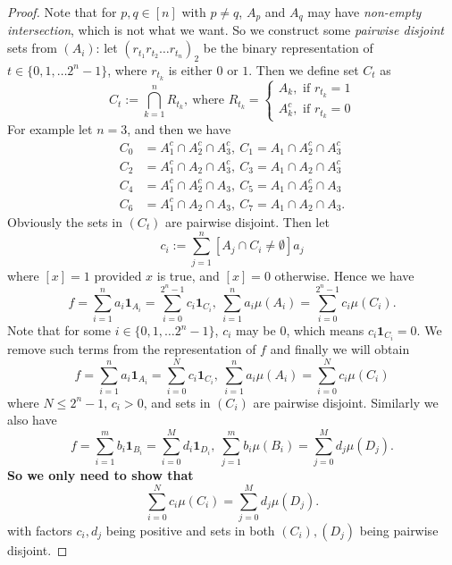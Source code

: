 \documentclass[a4paper, linespread=1.5]{article}
\newcommand{\IndicatorFunc}[1]{\mathbf{1}_{#1}}
\begin{document}
        \begin{proof}
            Note that for $p, q \in [n]$ with $p \neq q$, $A_p$ and $A_q$ may have \textit{non-empty intersection}, which is not what we want. So we construct some {\it pairwise disjoint} sets from $(A_i)$: let $(r_{t_1}r_{t_2}\ldots r_{t_n})_2$ be the binary representation of $t \in \{0, 1, \ldots 2^n - 1\}$, where $r_{t_k}$ is either $0$ or $1$. Then we define set $C_t$ as
            $$
            C_t := \bigcap_{k = 1}^n R_{t_k},\ \textrm{where } R_{t_k} = \left\{
            \begin{aligned}
            A_k, \textrm{ if } r_{t_k} = 1 \\
            A_k^c, \textrm{ if } r_{t_k} = 0
            \end{aligned}
            \right.
            $$
            For example let $n = 3$, and then we have
            \begin{align*}
                C_0 &= A_1^c \cap A_2^c \cap A_3^c,\ C_1 = A_1 \cap A_2^c \cap A_3^c \\
                C_2 &= A_1^c \cap A_2 \cap A_3^c,\ C_3 = A_1 \cap A_2 \cap A_3^c \\
                C_4 &= A_1^c \cap A_2^c \cap A_3,\ C_5 = A_1 \cap A_2^c \cap A_3 \\
                C_6 &= A_1^c \cap A_2 \cap A_3,\ C_7 = A_1 \cap A_2 \cap A_3.
            \end{align*}
            Obviously the sets in $(C_t)$ are pairwise disjoint. Then let
            $$
            c_i := \sum_{j = 1}^n [A_j \cap C_i \neq \emptyset]a_j
            $$
            where $[x] = 1$ provided $x$ is true, and $[x] = 0$ otherwise. Hence we have
            $$
            f = \sum_{i = 1}^n a_i\IndicatorFunc{A_i} = \sum_{i = 0}^{2^n - 1} c_i\IndicatorFunc{C_i},\ \sum_{i = 1}^n a_i\mu(A_i) = \sum_{i = 0}^{2^n - 1} c_i\mu(C_i).
            $$
            Note that for some $i \in \{0, 1, \ldots 2^n - 1\}$, $c_i$ may be $0$, which means $c_i\IndicatorFunc{C_i} = 0$. We remove such terms from the representation of $f$ and finally we will obtain
            $$
            f = \sum_{i = 1}^n a_i\IndicatorFunc{A_i} = \sum_{i = 0}^N c_i\IndicatorFunc{C_i},\ \sum_{i = 1}^n a_i\mu(A_i) = \sum_{i = 0}^N c_i\mu(C_i)
            $$
            where $N \leqslant 2^n - 1$, $c_i > 0$, and sets in $(C_i)$ are pairwise disjoint. Similarly we also have
            $$
            f = \sum_{i = 1}^m b_i\IndicatorFunc{B_i} = \sum_{i = 0}^M d_i\IndicatorFunc{D_i},\ \sum_{j = 1}^m b_i\mu(B_i) = \sum_{j = 0}^M d_j\mu(D_j).
            $$
            \textbf{So we only need to show that}
            $$
            \sum_{i = 0}^N c_i\mu(C_i) = \sum_{j = 0}^M d_j\mu(D_j).
            $$
            with factors $c_i, d_j$ being positive and sets in both $(C_i), (D_j)$ being pairwise disjoint.
            \bigskip
            

\end{proof}
\end{document}
